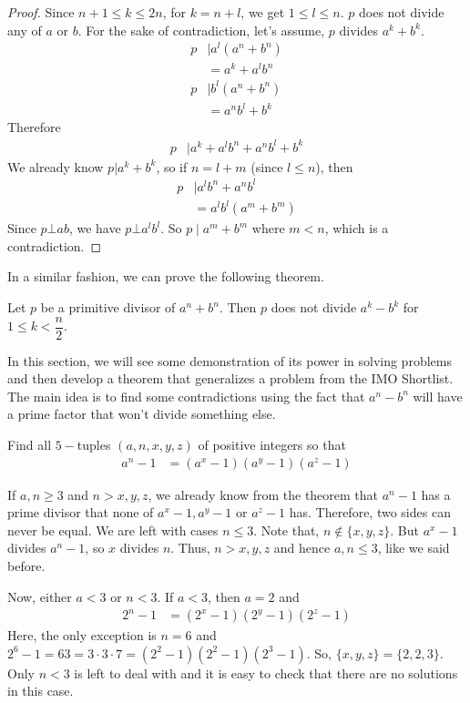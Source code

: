 \documentclass{subfile}
\begin{document}
		\begin{proof}
			Since $n+1\leq k\leq2n$, for $k=n+l$, we get $1\leq l\leq n$. $p$ does not divide any of $a$ or $b$. For the sake of contradiction, let's assume, $p$ divides $a^k+b^k$.
				\begin{align*}
					p
						& \mid a^l(a^n+b^n)\\
						& = a^k+a^lb^n\\
					p
						& \mid b^l(a^n+b^n)\\
						& = a^nb^l+b^k
				\end{align*}
			Therefore
			\begin{align*}
				p
					& \mid a^k+a^lb^n+a^nb^l+b^k
			\end{align*}
			We already know $p|a^k+b^k$, so if $n=l+m$ (since $l\leq n$), then
				\begin{align*}
					p
						& \mid a^lb^n+a^nb^l\\
						& = a^lb^l(a^m+b^m)
				\end{align*}
			Since $p\bot ab$, we have $p\bot a^lb^l$. So $p\mid a^m+b^m$ where $m< n$, which is a contradiction.
		\end{proof}
	In a similar fashion, we can prove the following theorem.
		\begin{theorem}
			Let $p$ be a primitive divisor of $a^n+b^n$. Then $p$ does not divide $a^k-b^k$ for $1\leq k<\dfrac{n}{2}$.
		\end{theorem}

	In this section, we will see some demonstration of its power in solving problems and then develop a theorem that generalizes a problem from the IMO Shortlist. The main idea is to find some contradictions using the fact that $a^n-b^n$ will have a prime factor that won't divide something else.
		\begin{problem}
			Find all $5-$tuples $(a,n,x,y,z)$ of positive integers so that
				\begin{align*}
					a^n-1 & = (a^x-1)(a^y-1)(a^z-1)
				\end{align*}
		\end{problem}

		\begin{solution}
			If $a,n\geq3$ and $n>x,y,z$, we already know from the theorem that $a^n-1$ has a prime divisor that none of $a^x-1,a^y-1$ or $a^z-1$ has. Therefore, two sides can never be equal. We are left with cases $n\leq3$. Note that, $n\notin\{x,y,z\}$. But $a^x-1$ divides $a^n-1$, so $x$ divides $n$. Thus, $n>x,y,z$ and hence $a,n\leq3$, like we said before.

			Now, either $a<3$ or $n<3$. If $a<3$, then $a=2$ and
				\begin{align*}
					2^n-1 & = (2^x-1)(2^y-1)(2^z-1)
				\end{align*}
			Here, the only exception is $n=6$ and $2^6-1=63=3\cdot3\cdot7=(2^2-1)(2^2-1)(2^3-1)$. So, $\{x,y,z\}=\{2,2,3\}$. Only $n<3$ is left to deal with and it is easy to check that there are no solutions in this case.
		\end{solution}
\end{document}
